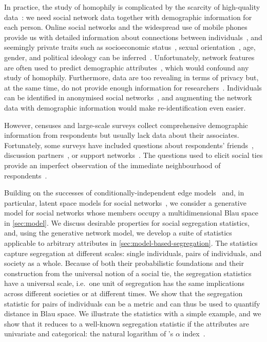 \documentclass{scrartcl}
\begin{document}
\begin{refsection}
In practice, the study of homophily is complicated by the scarcity of high-quality data~\cite{Butts2012, Blumenstock2013}: we need social network data together with demographic information for each person. Online social networks and the widespread use of mobile phones provide us with detailed information about connections between individuals~\cite{Golder2014}, and seemingly private traits such as socioeconomic status~\cite{Blumenstock2015, Luo2017}, sexual orientation~\cite{Wang2017}, age, gender, and political ideology can be inferred~\cite{Kosinski2013}. Unfortunately, network features are often used to predict demographic attributes~\cite{Wang2013,Blumenstock2015,Luo2017,Kosinski2013}, which would confound any study of homophily. Furthermore, data are too revealing in terms of privacy but, at the same time, do not provide enough information for researchers~\cite{Golder2014}. Individuals can be identified in anonymised social networks~\cite{Backstrom2011, Narayanan2008}, and augmenting the network data with demographic information would make re-identification even easier.

However, censuses and large-scale surveys collect comprehensive demographic information from respondents but usually lack data about their associates. Fortunately, some surveys have included questions about respondents' friends~\cite{Huckfeldt1983, Johnson1989}, discussion partners~\cite{Marsden1987, McPherson2006}, or support networks~\cite{Kalmijn2007, Banerjee2013}. The questions used to elicit social ties provide an imperfect observation of the immediate neighbourhood of respondents~\cite{Marin2004,Eagle2015,Eveland-Jr.2017}.

Building on the successes of conditionally-independent edge models~\cite{Snijders2011} and, in particular, latent space models for social networks~\cite{Hoff2002,Hoff2008}, we consider a generative model for social networks whose members occupy a multidimensional Blau space in \cref{sec:model}. We discuss desirable properties for social segregation statistics, and, using the generative network model, we develop a suite of statistics applicable to arbitrary attributes in \cref{sec:model-based-segregation}. The statistics capture segregation at different scales: single individuals, pairs of individuals, and society as a whole. Because of both their probabilistic foundations and their construction from the universal notion of a social tie, the segregation statistics have a universal scale, i.e.\ one unit of segregation has the same implications across different societies or at different times. We show that the segregation statistic for pairs of individuals can be a metric and can thus be used to quantify distance in Blau space. We illustrate the statistics with a simple example, and we show that it reduces to a well-known segregation statistic if the attributes are univariate and categorical: the natural logarithm of \citeauthor{Moody2001}'s $\alpha$ index~\cite{Moody2001}.


\end{refsection}
\end{document}
